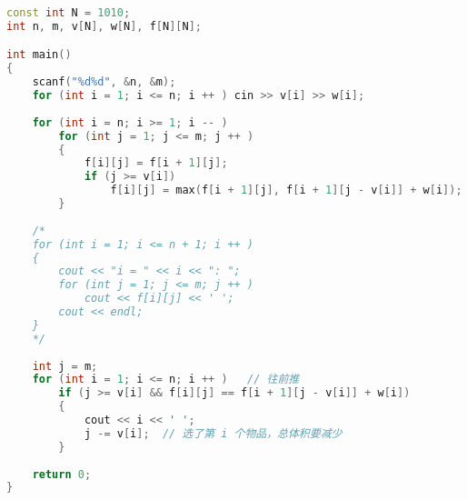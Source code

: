 \begin{lstlisting}[language=cpp]
const int N = 1010;
int n, m, v[N], w[N], f[N][N];

int main()
{
    scanf("%d%d", &n, &m);
    for (int i = 1; i <= n; i ++ ) cin >> v[i] >> w[i];
    
    for (int i = n; i >= 1; i -- )
        for (int j = 1; j <= m; j ++ )
        {
            f[i][j] = f[i + 1][j];
            if (j >= v[i])
            	f[i][j] = max(f[i + 1][j], f[i + 1][j - v[i]] + w[i]);
        }
      
    /* 
    for (int i = 1; i <= n + 1; i ++ )
    {
        cout << "i = " << i << ": ";
        for (int j = 1; j <= m; j ++ )
            cout << f[i][j] << ' ';
        cout << endl;
    }
    */
    
    int j = m;
    for (int i = 1; i <= n; i ++ )   // 往前推
        if (j >= v[i] && f[i][j] == f[i + 1][j - v[i]] + w[i])
        {
            cout << i << ' ';
            j -= v[i];  // 选了第 i 个物品，总体积要减少
        }
    
    return 0;
}
\end{lstlisting}

